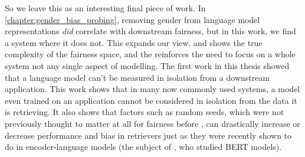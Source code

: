 So we leave this as an interesting final piece of work. In \ref{chapter:gender_bias_probing}, removing gender from language model representations \textit{did} correlate with downstream fairness, but in this work, we find a system where it does not. This expands our view, and shows the true complexity of the fairness space, and the reinforces the need to focus on a whole system not any single aspect of modelling. The first work in this thesis showed that a language model can't be measured in isolation from a downstream application. This work shows that in many now commonly used systems, a model even trained on an application cannot be considered in isolation from the data it is retrieving. It also shows that factors such as random seeds, which were not previously thought to matter at all for fairness before \citep{multiberts}, can drastically increase or decrease performance and bias in retrievers just as they were recently shown to do in encoder-language models (the subject of \citet{multiberts}, who studied BERT models). 





